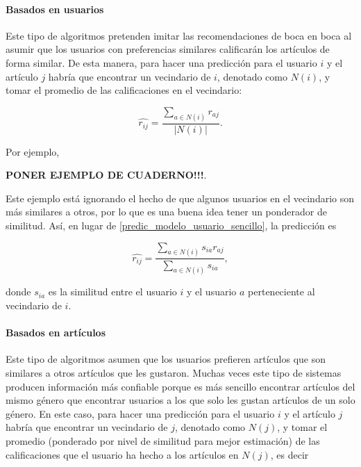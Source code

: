 \paragraph{Basados en usuarios}

Este tipo de algoritmos pretenden imitar las recomendaciones de boca en boca al asumir que los usuarios con preferencias similares calificarán los artículos de forma similar. De esta manera, para hacer una predicción para el usuario $i$ y el artículo $j$ habría que encontrar un vecindario de $i$, denotado como $N(i)$, y tomar el promedio de las calificaciones en el vecindario:

\begin{equation}\label{predic_modelo_usuario_sencillo}
 \hat{r_{ij}} = \frac{\sum_{a \in N(i)} r_{aj}}{\vert N(i) \vert}.
\end{equation}

Por ejemplo,

\textbf{PONER EJEMPLO DE CUADERNO!!!}.

Este ejemplo está ignorando el hecho de que algunos usuarios en el vecindario son más similares a otros, por lo que es una buena idea tener un ponderador de similitud. Así, en lugar de \ref{predic_modelo_usuario_sencillo}, la predicción es

\begin{equation}\label{predic_modelo_usuario_ponderado}
 \hat{r_{ij}} = \frac{\sum_{a \in N(i)} s_{ia} r_{aj}}{\sum_{a \in N(i)} s_{ia}},
\end{equation}

donde $s_{ia}$ es la similitud entre el usuario $i$ y el usuario $a$ perteneciente al vecindario de $i$.

\paragraph{Basados en artículos}

Este tipo de algoritmos asumen que los usuarios prefieren artículos que son similares a otros artículos que les gustaron. Muchas veces este tipo de sistemas producen información más confiable porque es más sencillo encontrar artículos del mismo género que encontrar usuarios a los que solo les gustan artículos de un solo género. En este caso, para hacer una predicción para el usuario $i$ y el artículo $j$ habría que encontrar un vecindario de $j$, denotado como $N(j)$, y tomar el promedio (ponderado por nivel de similitud para mejor estimación) de las calificaciones que el usuario ha hecho a los artículos en $N(j)$, es decir

